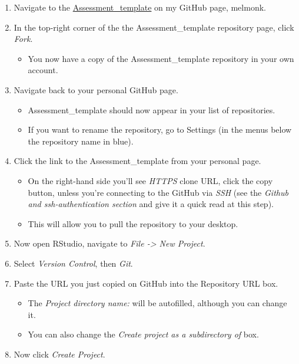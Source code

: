 \documentclass[12pt,]{article}
\providecommand{\tightlist}{%
  \setlength{\itemsep}{0pt}\setlength{\parskip}{0pt}}
\begin{document}
\begin{enumerate}
\def\labelenumi{\arabic{enumi}.}
\tightlist
\item
  Navigate to the
  \href{https://github.com/melmonk/Assessment_template}{Assessment\_template}
  on my GitHub page, melmonk.
\item
  In the top-right corner of the the Assessment\_template repository
  page, click \emph{Fork}.

  \begin{itemize}
  \tightlist
  \item
    You now have a copy of the Assessment\_template repository in your
    own account.
  \end{itemize}
\item
  Navigate back to your personal GitHub page.

  \begin{itemize}
  \tightlist
  \item
    Assessment\_template should now appear in your list of repositories.
  \item
    If you want to rename the repository, go to Settings (in the menus
    below the repository name in blue).
  \end{itemize}
\item
  Click the link to the Assessment\_template from your personal page.

  \begin{itemize}
  \tightlist
  \item
    On the right-hand side you'll see \emph{HTTPS} clone URL, click the
    copy button, unless you're connecting to the GitHub via \emph{SSH}
    (see the \emph{Github and ssh-authentication section} and give it a
    quick read at this step).
  \item
    This will allow you to pull the repository to your desktop.
  \end{itemize}
\item
  Now open RStudio, navigate to \emph{File -\textgreater{} New Project}.
\item
  Select \emph{Version Control}, then \emph{Git}.
\item
  Paste the URL you just copied on GitHub into the Repository URL box.

  \begin{itemize}
  \tightlist
  \item
    The \emph{Project directory name:} will be autofilled, although you
    can change it.
  \item
    You can also change the \emph{Create project as a subdirectory of}
    box.
  \end{itemize}
\item
  Now click \emph{Create Project}.


\end{enumerate}
\end{document}
